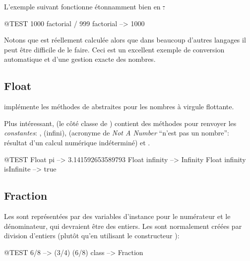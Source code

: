 \documentclass[a4paper,10pt,twoside]{book}
\begin{document}
L'exemple suivant fonctionne étonnamment bien en \st:
\begin{code}{@TEST}
1000 factorial / 999 factorial --> 1000
\end{code}
Notons que  est réellement calculée alors que dans beaucoup d'autres langages il peut être difficile de le faire. Ceci est un excellent exemple de conversion automatique et d'une gestion exacte des nombres.


\subsection{Float}

 implémente les méthodes de  abstraites pour les nombres à virgule flottante.

Plus intéressant,  (\ie le côté classe de
) contient des méthodes pour renvoyer les
\emph{constantes}: , 
(infini), 
(acronyme de \emph{Not A Number} \cad ``n'est pas un nombre'':
résultat d'un calcul numérique indéterminé)
et .

\begin{code}{@TEST}
Float pi                      --> 3.141592653589793
Float infinity               --> Infinity
Float infinity isInfinite --> true
\end{code}

\subsection{Fraction}

Les  sont représentées par des variables d'instance pour le numérateur et le dénominateur, qui devraient être des entiers. Les  sont normalement créées par division d'entiers (plutôt qu'en utilisant le constructeur ):

\begin{code}{@TEST}
6/8             --> (3/4)
(6/8) class --> Fraction
\end{code}
\end{document}

